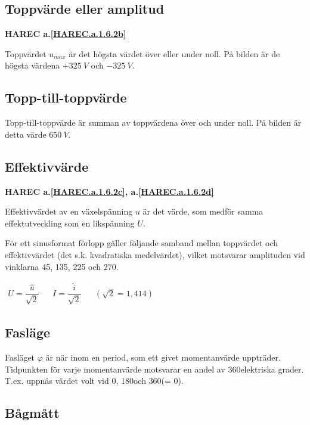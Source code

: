 \subsection{Toppvärde eller amplitud}
\textbf{HAREC a.\ref{HAREC.a.1.6.2b}\label{myHAREC.a.1.6.2b}}

Toppvärdet \(u_{max}\) är det högsta värdet över eller under noll. På bilden är
de högsta värdena \(+325\ V\) och \(-325\ V\).

\subsection{Topp-till-toppvärde}

Topp-till-toppvärde är summan av toppvärdena över och under noll. På bilden
är detta värde \(650\ V\).

\subsection{Effektivvärde}
\textbf{HAREC a.\ref{HAREC.a.1.6.2c}, a.\ref{HAREC.a.1.6.2d}\label{myHAREC.a.1.6.2c}\label{myHAREC.a.1.6.2d}}

Effektivvärdet av en växelspänning \(u\) är det värde, som medför samma
effektutveckling som en likspänning \(U\).

För ett sinusformat förlopp gäller följande samband mellan toppvärdet och
effektivvärdet (det s.k. kvadratiska medelvärdet), vilket motsvarar amplituden
vid vinklarna 45, 135, 225 och 270\degree.

\(
\begin{array}{lllll}
U=\dfrac{\hat{u}}{\sqrt{2}} & & I=\dfrac{\hat{i}}{\sqrt{2}} & & (\sqrt{2} = 1,414)
\end{array}
\)

\subsection{Fasläge}

Fasläget \(\varphi\) är när inom en period, som ett givet momentanvärde uppträder.
Tidpunkten för varje momentanvärde motsvarar en andel av 360\degree elektriska
grader.
T.ex. uppnås värdet volt vid 0\degree, 180\degree och 360\degree (= 0\degree).

\subsection{Bågmått}

